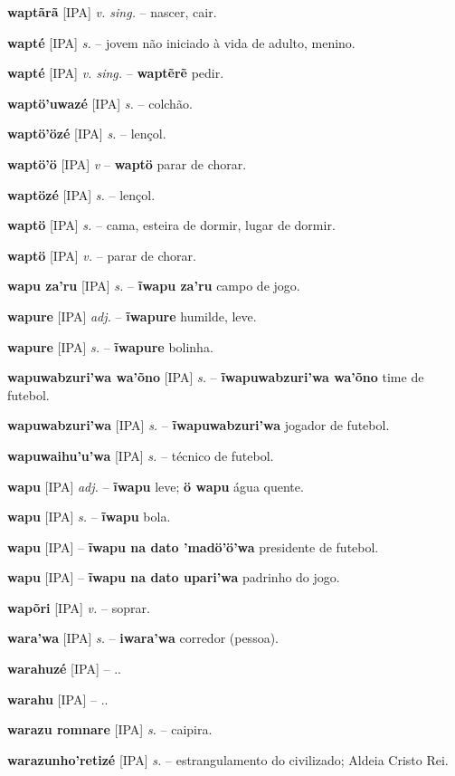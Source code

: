 \textbf{waptãrã} [IPA] \textit{v. sing.} -- nascer, cair.

\textbf{wapté} [IPA] \textit{s.} -- jovem não iniciado à vida de adulto, menino.

\textbf{wapté} [IPA] \textit{v. sing.} -- \textbf{waptẽrẽ} pedir.

\textbf{waptö'uwazé} [IPA] \textit{s.} -- colchão.

\textbf{waptö'özé} [IPA] \textit{s.} -- lençol.

\textbf{waptö'ö} [IPA] \textit{v} -- \textbf{waptö} parar de chorar.

\textbf{waptözé} [IPA] \textit{s.} -- lençol.

\textbf{waptö} [IPA] \textit{s.} -- cama, esteira de dormir, lugar de dormir.

\textbf{waptö} [IPA] \textit{v.} -- parar de chorar.

\textbf{wapu za'ru} [IPA] \textit{s.} -- \textbf{ĩwapu za'ru} campo de jogo.

\textbf{wapure} [IPA] \textit{adj.} -- \textbf{ĩwapure} humilde, leve.

\textbf{wapure} [IPA] \textit{s.} -- \textbf{ĩwapure} bolinha.

\textbf{wapuwabzuri'wa wa'õno} [IPA] \textit{s.} -- \textbf{ĩwapuwabzuri'wa wa'õno} time de futebol.

\textbf{wapuwabzuri'wa} [IPA] \textit{s.} -- \textbf{ĩwapuwabzuri'wa} jogador de futebol.

\textbf{wapuwaihu'u'wa} [IPA] \textit{s.} -- técnico de futebol.

\textbf{wapu} [IPA] \textit{adj.} -- \textbf{ĩwapu} leve; \textbf{ö wapu} água quente.

\textbf{wapu} [IPA] \textit{s.} -- \textbf{ĩwapu} bola.

\textbf{wapu} [IPA] \textit{} -- \textbf{ĩwapu na dato 'madö'ö'wa} presidente de futebol.

\textbf{wapu} [IPA] \textit{} -- \textbf{ĩwapu na dato upari'wa} padrinho do jogo.

\textbf{wapõri} [IPA] \textit{v.} -- soprar.

\textbf{wara'wa} [IPA] \textit{s.} -- \textbf{iwara'wa} corredor (pessoa).

\textbf{warahuzé} [IPA] \textit{} -- ..

\textbf{warahu} [IPA] \textit{} -- ..

\textbf{warazu romnare} [IPA] \textit{s.} -- caipira.

\textbf{warazunho'retizé} [IPA] \textit{s.} -- estrangulamento do civilizado; Aldeia Cristo Rei.

